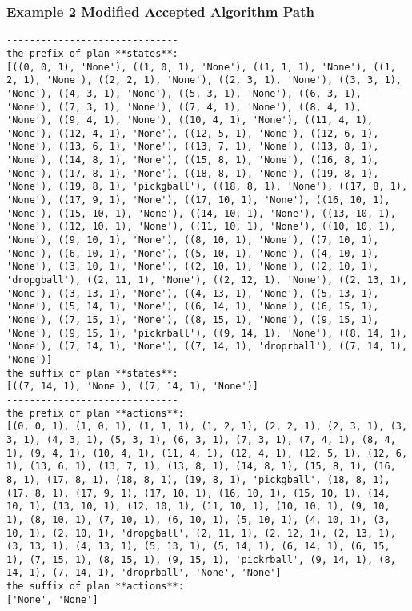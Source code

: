 \subsubsection{Example 2 Modified Accepted Algorithm Path}
\begin{lstlisting}
------------------------------
the prefix of plan **states**:
[((0, 0, 1), 'None'), ((1, 0, 1), 'None'), ((1, 1, 1), 'None'), ((1, 2, 1), 'None'), ((2, 2, 1), 'None'), ((2, 3, 1), 'None'), ((3, 3, 1), 'None'), ((4, 3, 1), 'None'), ((5, 3, 1), 'None'), ((6, 3, 1), 'None'), ((7, 3, 1), 'None'), ((7, 4, 1), 'None'), ((8, 4, 1), 'None'), ((9, 4, 1), 'None'), ((10, 4, 1), 'None'), ((11, 4, 1), 'None'), ((12, 4, 1), 'None'), ((12, 5, 1), 'None'), ((12, 6, 1), 'None'), ((13, 6, 1), 'None'), ((13, 7, 1), 'None'), ((13, 8, 1), 'None'), ((14, 8, 1), 'None'), ((15, 8, 1), 'None'), ((16, 8, 1), 'None'), ((17, 8, 1), 'None'), ((18, 8, 1), 'None'), ((19, 8, 1), 'None'), ((19, 8, 1), 'pickgball'), ((18, 8, 1), 'None'), ((17, 8, 1), 'None'), ((17, 9, 1), 'None'), ((17, 10, 1), 'None'), ((16, 10, 1), 'None'), ((15, 10, 1), 'None'), ((14, 10, 1), 'None'), ((13, 10, 1), 'None'), ((12, 10, 1), 'None'), ((11, 10, 1), 'None'), ((10, 10, 1), 'None'), ((9, 10, 1), 'None'), ((8, 10, 1), 'None'), ((7, 10, 1), 'None'), ((6, 10, 1), 'None'), ((5, 10, 1), 'None'), ((4, 10, 1), 'None'), ((3, 10, 1), 'None'), ((2, 10, 1), 'None'), ((2, 10, 1), 'dropgball'), ((2, 11, 1), 'None'), ((2, 12, 1), 'None'), ((2, 13, 1), 'None'), ((3, 13, 1), 'None'), ((4, 13, 1), 'None'), ((5, 13, 1), 'None'), ((5, 14, 1), 'None'), ((6, 14, 1), 'None'), ((6, 15, 1), 'None'), ((7, 15, 1), 'None'), ((8, 15, 1), 'None'), ((9, 15, 1), 'None'), ((9, 15, 1), 'pickrball'), ((9, 14, 1), 'None'), ((8, 14, 1), 'None'), ((7, 14, 1), 'None'), ((7, 14, 1), 'droprball'), ((7, 14, 1), 'None')]
the suffix of plan **states**:
[((7, 14, 1), 'None'), ((7, 14, 1), 'None')]
------------------------------
the prefix of plan **actions**:
[(0, 0, 1), (1, 0, 1), (1, 1, 1), (1, 2, 1), (2, 2, 1), (2, 3, 1), (3, 3, 1), (4, 3, 1), (5, 3, 1), (6, 3, 1), (7, 3, 1), (7, 4, 1), (8, 4, 1), (9, 4, 1), (10, 4, 1), (11, 4, 1), (12, 4, 1), (12, 5, 1), (12, 6, 1), (13, 6, 1), (13, 7, 1), (13, 8, 1), (14, 8, 1), (15, 8, 1), (16, 8, 1), (17, 8, 1), (18, 8, 1), (19, 8, 1), 'pickgball', (18, 8, 1), (17, 8, 1), (17, 9, 1), (17, 10, 1), (16, 10, 1), (15, 10, 1), (14, 10, 1), (13, 10, 1), (12, 10, 1), (11, 10, 1), (10, 10, 1), (9, 10, 1), (8, 10, 1), (7, 10, 1), (6, 10, 1), (5, 10, 1), (4, 10, 1), (3, 10, 1), (2, 10, 1), 'dropgball', (2, 11, 1), (2, 12, 1), (2, 13, 1), (3, 13, 1), (4, 13, 1), (5, 13, 1), (5, 14, 1), (6, 14, 1), (6, 15, 1), (7, 15, 1), (8, 15, 1), (9, 15, 1), 'pickrball', (9, 14, 1), (8, 14, 1), (7, 14, 1), 'droprball', 'None', 'None']
the suffix of plan **actions**:
['None', 'None']
\end{lstlisting}

